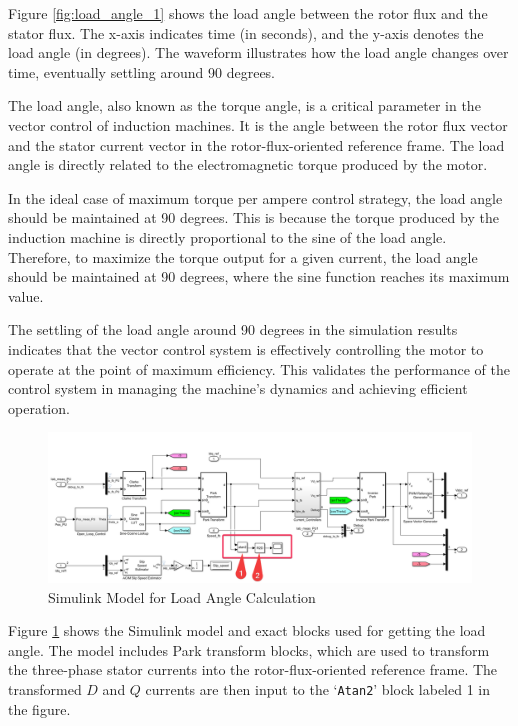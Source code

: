 Figure \ref{fig:load_angle_1} shows the load angle between the rotor flux and the stator flux. The x-axis indicates time (in seconds), and the y-axis denotes the load angle (in degrees). The waveform illustrates how the load angle changes over time, eventually settling around 90 degrees.

The load angle, also known as the torque angle, is a critical parameter in the vector control of induction machines. It is the angle between the rotor flux vector and the stator current vector in the rotor-flux-oriented reference frame. The load angle is directly related to the electromagnetic torque produced by the motor. 

In the ideal case of maximum torque per ampere control strategy, the load angle should be maintained at 90 degrees. This is because the torque produced by the induction machine is directly proportional to the sine of the load angle. Therefore, to maximize the torque output for a given current, the load angle should be maintained at 90 degrees, where the sine function reaches its maximum value.

The settling of the load angle around 90 degrees in the simulation results indicates that the vector control system is effectively controlling the motor to operate at the point of maximum efficiency. This validates the performance of the control system in managing the machine's dynamics and achieving efficient operation.


\begin{figure}
	\centering
	\includegraphics[width=7in]{sections/section3/images/simulationResutls/howTogetloadAngle.png}
	\caption{Simulink Model for Load Angle Calculation}
	\label{fig:loadAngleBlocks}
\end{figure}


Figure \ref{fig:loadAngleBlocks} shows the Simulink model and exact blocks used for getting the load angle. The model includes Park transform blocks, which are used to transform the three-phase stator currents into the rotor-flux-oriented reference frame. The transformed $D$ and $Q$ currents are then input to the `\texttt{Atan2}' block labeled 1 in the figure.

